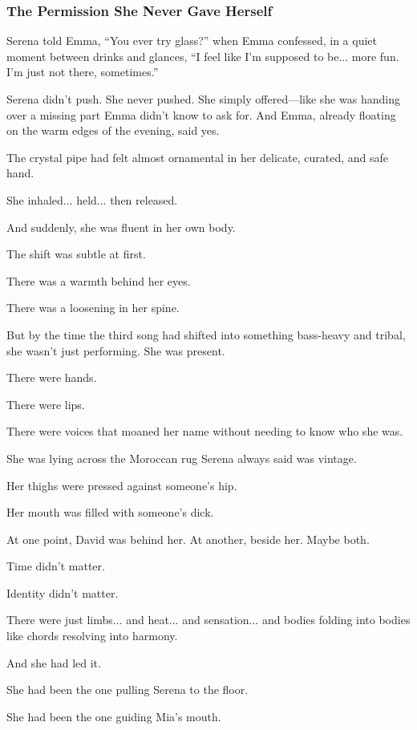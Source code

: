 \medskip

\subsubsection{The Permission She Never Gave Herself}

Serena told Emma, “You ever try glass?” when Emma confessed, in a quiet moment between drinks and glances,
“I feel like I’m supposed to be... more fun. I’m just not there, sometimes.”

Serena didn’t push. She never pushed. She simply offered—like she was handing over a missing part Emma 
didn’t know to ask for.  And Emma, already floating on the warm edges of the evening, said yes.

The crystal pipe had felt almost ornamental in her delicate, curated, and safe hand.

She inhaled... held... then released.

And suddenly, she was fluent in her own body.

The shift was subtle at first. 

There was a warmth behind her eyes. 

There was a loosening in her spine. 

But by the time the third song had shifted into something bass-heavy and tribal, she wasn’t just performing. 
She was present.

There were hands. 

There were lips. 

There were voices that moaned her name without needing to know who she was.

She was lying across the Moroccan rug Serena always said was vintage. 

Her thighs were pressed against someone’s hip. 

Her mouth was filled with someone's dick.

At one point, David was behind her. At another, beside her. Maybe 
both. 

Time didn’t matter. 

Identity didn’t matter. 

There were just limbs... and heat... and sensation... and bodies folding 
into bodies like chords resolving into harmony.

And she had led it.

She had been the one pulling Serena to the floor. 

She had been the one guiding Mia’s mouth.

